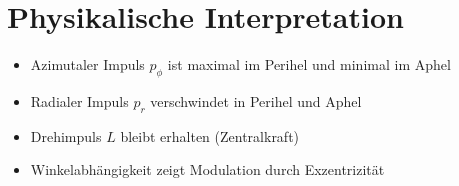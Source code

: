 \section{Physikalische Interpretation}
\begin{itemize}
    \item Azimutaler Impuls $p_\phi$ ist maximal im Perihel und minimal im Aphel
    \item Radialer Impuls $p_r$ verschwindet in Perihel und Aphel
    \item Drehimpuls $L$ bleibt erhalten (Zentralkraft)
    \item Winkelabhängigkeit zeigt Modulation durch Exzentrizität
\end{itemize}